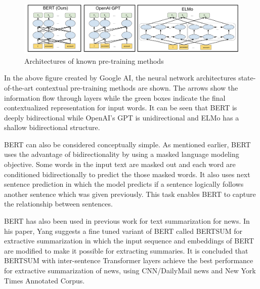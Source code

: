 \documentclass{article}
\begin{document}
\begin{figure}[h]
    \centering
    \includegraphics[scale=0.2]{image3.png}
    \caption{Architectures of known pre-training methods}
    \label{fig:mesh1}
\end{figure}

In the above figure created by Google AI, the neural network architectures state-of-the-art contextual pre-training methods are shown. The arrows show the information flow through layers while the green boxes indicate the final contextualized representation for input words. It can be seen that BERT is deeply bidirectional while OpenAI's GPT is unidirectional and ELMo has a shallow bidirectional structure.

BERT can also be considered conceptually simple. As mentioned earlier, BERT uses the advantage of bidirectionality by using a masked language modeling objective. Some words in the input text are masked out and each word are conditioned bidirectionally to predict the those masked words. It also uses next sentence prediction in which the model predicts if a sentence logically follows another sentence which was given previously. This task enables BERT to capture the relationship between sentences. \cite{devlin2019bert}

BERT has also been used in previous work for text summarization for news. In his paper, Yang suggests a fine tuned variant of BERT called BERTSUM for extractive summarization in which the input sequence and embeddings of BERT are modified to make it possible for extracting summaries. It is concluded that BERTSUM with inter-sentence Transformer layers achieve the best performance for extractive summarization of news, using CNN/DailyMail news and New York Times Annotated Corpus. \cite{liu2019finetune}

\end{document}
